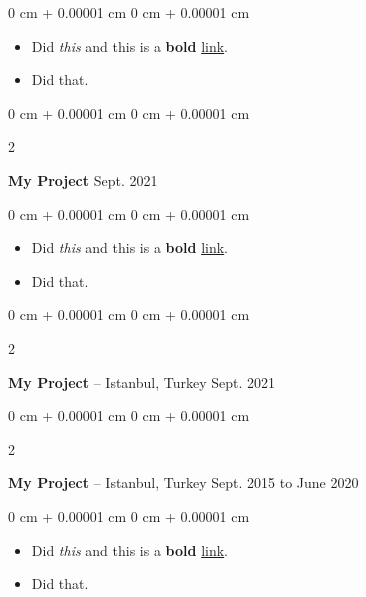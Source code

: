 \documentclass[10pt, letterpaper]{article}
\newenvironment{highlights}{
    \begin{itemize}[
        topsep=0.10 cm,
        parsep=0.10 cm,
        partopsep=0pt,
        itemsep=0pt,
        leftmargin=0 cm + 10pt
    ]
}{
    \end{itemize}
} %
\newenvironment{onecolentry}{
    \begin{adjustwidth}{
        0 cm + 0.00001 cm
    }{
        0 cm + 0.00001 cm
    }
}{
    \end{adjustwidth}
} %
\newenvironment{twocolentry}[2][]{
    \onecolentry
    \def\secondColumn{#2}
    \setcolumnwidth{\fill, 4.5 cm}
    \begin{paracol}{2}
}{
    \switchcolumn \raggedleft \secondColumn
    \end{paracol}
    \endonecolentry
} %
\begin{document}
        \vspace{0.10 cm}
        \begin{onecolentry}
            \begin{highlights}
                \item Did \textit{this} and this is a \textbf{bold} \href{https://example.com}{link}.
                \item Did that.
            \end{highlights}
        \end{onecolentry}


        \vspace{0.2 cm}

        \begin{twocolentry}{
            Sept. 2021
        }
            \textbf{My Project}\end{twocolentry}

        \vspace{0.10 cm}
        \begin{onecolentry}
            \begin{highlights}
                \item Did \textit{this} and this is a \textbf{bold} \href{https://example.com}{link}.
                \item Did that.
            \end{highlights}
        \end{onecolentry}


        \vspace{0.2 cm}

        \begin{twocolentry}{
            Sept. 2021
        }
            \textbf{My Project} -- Istanbul, Turkey\end{twocolentry}



        \vspace{0.2 cm}

        \begin{twocolentry}{
            Sept. 2015 to June 2020
        }
            \textbf{My Project} -- Istanbul, Turkey\end{twocolentry}

        \vspace{0.10 cm}
        \begin{onecolentry}
            \begin{highlights}
                \item Did \textit{this} and this is a \textbf{bold} \href{https://example.com}{link}.
                \item Did that.
            \end{highlights}
        \end{onecolentry}
\end{document}
